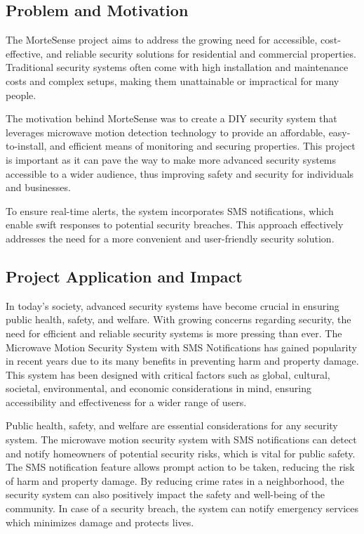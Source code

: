 \documentclass[conference]{IEEEtran}
\begin{document}
\subsection{Problem and Motivation}

The MorteSense project aims to address the growing need for accessible, cost-effective,
and reliable security solutions for residential and commercial properties. Traditional
security systems often come with high installation and maintenance costs and complex
setups, making them unattainable or impractical for many people.

The motivation behind MorteSense was to create a DIY security system that leverages
microwave motion detection technology to provide an affordable, easy-to-install, and
efficient means of monitoring and securing properties. This project is important as
it can pave the way to make more advanced security systems accessible to a wider
audience, thus improving safety and security for individuals and businesses.

To ensure real-time alerts, the system incorporates SMS notifications, which enable
swift responses to potential security breaches. This approach effectively addresses
the need for a more convenient and user-friendly security solution.

\subsection{Project Application and Impact}

In today's society, advanced security systems have become crucial in ensuring public
health, safety, and welfare. With growing concerns regarding security, the need for
efficient and reliable security systems is more pressing than ever. The Microwave
Motion Security System with SMS Notifications has gained popularity in recent years
due to its many benefits in preventing harm and property damage. This system has
been designed with critical factors such as global, cultural, societal, environmental,
and economic considerations in mind, ensuring accessibility and effectiveness for a
wider range of users.

Public health, safety, and welfare are essential considerations for any security system.
The microwave motion security system with SMS notifications can detect and notify
homeowners of potential security risks, which is vital for public safety. The SMS
notification feature allows prompt action to be taken, reducing the risk of harm
and property damage. By reducing crime rates in a neighborhood, the security system
can also positively impact the safety and well-being of the community. In case of a
security breach, the system can notify emergency services which minimizes damage and
protects lives.
\end{document}
